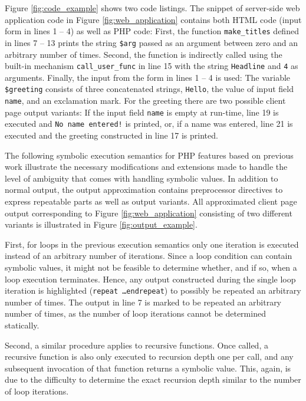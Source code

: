 \documentclass[sigconf]{acmart}
\begin{document}
Figure \ref{fig:code_example} shows two code listings. The snippet of server-side web
application code in Figure \ref{fig:web_application} contains both HTML code
(input form in lines 1 -- 4) as well as PHP code: First, the function
\texttt{make\_titles} defined in lines 7 – 13 prints the string \texttt{\$arg} passed as an argument between zero and an arbitrary number of
times. Second, the function is indirectly called using the built-in mechanism
\texttt{call\_user\_func} in line 15 with the string \texttt{Headline} and
\texttt{4} as arguments.  Finally, the input from the form in lines 1 – 4 is
used: The variable \texttt{\$greeting} consists of three concatenated strings,
\texttt{Hello}, the value of input field \texttt{name}, and an exclamation mark.
For the greeting there are two possible client page output
variants: If the input field \texttt{name} is empty at run-time, line 19 is
executed and \texttt{No name entered!} is printed, or, if a name was entered,
line 21 is executed and the greeting constructed in line 17 is printed.

The following symbolic execution semantics for PHP features based on
previous work \cite{Nguyen:2014:BCG:2635868.2635928} illustrate the necessary
modifications and extensions made to handle the level of ambiguity that comes with handling symbolic values. In addition to normal output, the
output approximation contains preprocessor directives to express
repeatable parts as well as output variants. All approximated client page
output corresponding to Figure \ref{fig:web_application} consisting of two different variants
is illustrated in Figure \ref{fig:output_example}.

First, for loops in the previous execution semantics
\cite{Nguyen:2014:BCG:2635868.2635928} only one iteration is executed instead of
an arbitrary number of iterations. Since a loop condition can contain symbolic
values, it might not be feasible to determine whether, and if so, when a loop
execution terminates. Hence, any output constructed during the single loop
iteration is highlighted (\texttt{repeat \ldots endrepeat}) to possibly be
repeated an arbitrary number of times. The output in line 7 is marked to be
repeated an arbitrary number of times, as the number of loop iterations cannot
be determined statically. 

Second, a similar procedure applies to recursive
functions. Once called, a recursive function is  also only executed to recursion
depth one per call, and any subsequent invocation of that function returns a
symbolic value. This, again, is due to the difficulty to determine the exact
recursion depth similar to the number of loop iterations.
\end{document}
